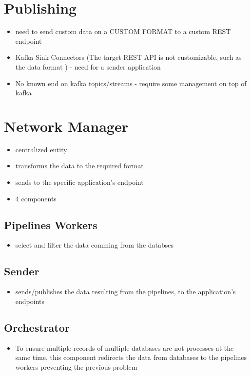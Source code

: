 \section{Publishing}

\begin{itemize}
    \item need to send custom data on a CUSTOM FORMAT to a custom REST endpoint
    \item Kafka Sink Connectors (The target REST API is not customizable, such as the data format ) - need for a sender application
    \item No known end on kafka topics/streams - require some management on top of kafka
\end{itemize}

\section{Network Manager}
\begin{itemize}
    \item centralized entity
    \item transforms the data to the required format
    \item sends to the specific application's endpoint
    \item 4 components
\end{itemize}

\subsection{Pipelines Workers}
\begin{itemize}
    \item select and filter the data comming from the databses
\end{itemize}
\subsection{Sender}
\begin{itemize}
    \item sends/publishes the data resulting from the pipelines, to the application's endpoints
\end{itemize}
\subsection{Orchestrator}
\begin{itemize}
    \item To ensure multiple records of multiple databases are not processes at the same time, this component redirects the data from databases to the pipelines workers preventing the previous problem
\end{itemize}
